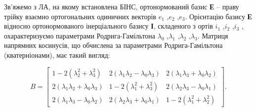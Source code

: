 Зв'яжемо з ЛА, на якому встановлена БІНС, ортонормований базис \textbf{Е} -- 
праву трійку взаємно ортогональних одиничних 
векторів $e_{1}$ ,$e_{2}$ ,$e_{3}$. Орієнтацію базису \textbf{Е} відносно ортонормованого 
інерціального базису \textbf{І}, складеного з ортів $i_{1}$ ,$i_{2}$ ,$i_{3}$ , охарактеризуємо 
параметрами Родрига-Гамільтона $\lambda_{0}$ ,$\lambda_{1}$ ,$\lambda_{2}$ ,$\lambda 
_{3}$. Матриця напрямних  косинусів, що обчислена за параметрами Родрига-Гамільтона 
(кватерніонами), має такий вигляд:

\[B=\left[
\begin{array}{ccc} {1-2(\lambda_{2}^{2} +\lambda_{3}^{2} )} & 
{2(\lambda_{1} \lambda_{2} -\lambda_{0} \lambda_{3} )} & 
{2(\lambda_{1} \lambda_{3} +\lambda_{0} \lambda_{2} )} \\ 
{2(\lambda_{1} \lambda_{2} +\lambda_{0} \lambda_{3} )} & 
{1-2(\lambda_{1}^{2} +\lambda_{3}^{2} )} & 
{2(\lambda_{2} \lambda_{3} -\lambda_{0} \lambda_{1} )} \\ 
{2(\lambda_{1} \lambda_{3} -\lambda_{0} \lambda_{2} )} & 
{2(\lambda_{2} \lambda_{3} +\lambda_{0} \lambda_{1} )} & 
{1-2(\lambda_{1}^{2} +\lambda_{2}^{2} )} \end{array}\right].\] 

